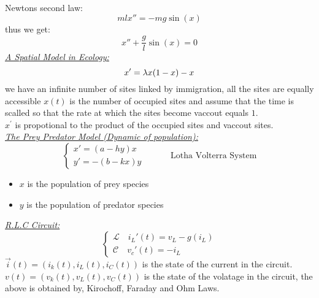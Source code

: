 Newtons second law:
\[
m l x'' = -mg \sin{(x) }
\]
thus we get: 
\[
x'' + \frac{g}{l} \sin{ (x) } = 0
\]
\underline{\emph{A Spatial Model in Ecology:}} 
\[
x' = \lambda x (1 - x)  - x
\]
we have an infinite number of sites linked by immigration, all the sites are equally accessible
$x(t)$ is the number of occupied sites and assume that the time is scalled 
so that the rate at which the sites become vaccout equals $1$. \\
$x^{'} $ is propotional to the product of the occupied sites and vaccout sites. \\
\underline{\emph{The Prey Predator Model (Dynamic of population):}} 
\[
\begin{cases}
x' = (a - hy) x \\
y' = -(b - kx) y 
\end{cases}
\quad \quad 
\quad 
\text{Lotha Volterra System} 
\]
\begin{itemize}
  \item $x $ is the population of prey species 
    \item $y $ is the population of predator species 
\end{itemize}
\underline{\emph{R.L.C Circuit:}} 
\[
  \begin{cases}
  \mathcal{L}  \quad 
  i_{L}' (t) = v_{L} - g(i_{L})   \\
  \mathcal{C} \quad 
  v_{c}'(t) = - i_{L} 
  \end{cases}
\]
$\vec{i}(t) = (i_{k}(t), i_{L}(t), i_{C}(t)  )$ is the state of the current 
in the circuit.\\
$v(t) = (v_{k}(t) , v_{L}(t) , v_{C}(t) )  $ is the state of the volatage in the circuit, 
the above is obtained by, Kirochoff, Faraday and Ohm Laws.
